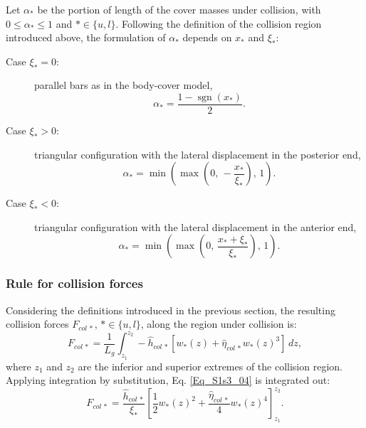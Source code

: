 \documentclass[a4paper,10pt]{article}
\begin{document}
Let $\alpha_{*}$ be the portion of length of the cover masses under collision, 
with $0 \leq \alpha_{*} \leq 1$ and $* \in \{u,l\}$. Following the definition of the collision region
introduced above, the formulation of $\alpha_{*}$ depends on $x_{*}$ and $\xi_{*}$:
\begin{description}
  \item[Case $\xi_{*}=0$:] parallel bars as in the body-cover model,
    \begin{equation}
      \alpha_{*} = \frac{1 - \operatorname{sgn}(x_{*} )}{2}.
    \end{equation}
  \item[Case $\xi_{*}>0$:] triangular configuration with the lateral displacement in the posterior end,
    \begin{equation}
      \alpha_{*} = \min\left( \max\left(0, \, -\frac{x_{*} }{\xi_{*}} \right), \, 1 \right).
    \end{equation}
  \item[Case $\xi_{*}<0$:] triangular configuration with the lateral displacement in the anterior end,
    \begin{equation}
      \alpha_{*} = \min\left( \max\left(0, \, \frac{x_{*}+\xi_{*}  }{\xi_{*}} \right), \, 1 \right).
    \end{equation}
\end{description}

\subsubsection{Rule for collision forces}
Considering the definitions introduced in the previous section, 
the resulting collision forces $F_{col\,*}$, $* \in \{u,l\}$, along the region under collision is:
\begin{equation} \label{Eq_S1s3_04}
  F_{col\,*} = \frac{1}{L_{g}} \int_{z_1}^{z_2} -\hat{h}_{col\,*} \left[
                    w_{*}(z) + \hat{\eta}_{col\,*} w_{*}(z)^3 \right] \, dz,
\end{equation}
where $z_1$ and $z_2$ are the inferior and superior extremes of the collision region.
Applying integration by substitution, Eq. \eqref{Eq_S1s3_04} is integrated out:
\begin{equation} \label{Eq_S1s3_05}
  F_{col\,*} = \frac{\hat{h}_{col\,*}}{\xi_{*}} \left[\frac{1}{2} w_{*}(z)^2 +
                      \frac{\hat{\eta}_{col\,*}}{4} w_{*}(z)^4  \right]_{z_1}^{z_2}.
\end{equation}
\end{document}
